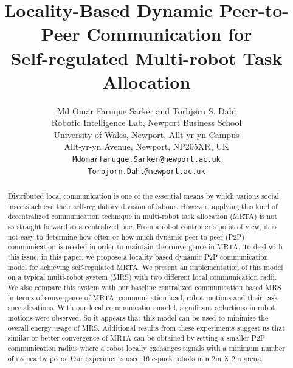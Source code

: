 \documentclass[letterpaper, 10 pt, times, conference]{ieeeconf} %
\title{\LARGE \bf
Locality-Based Dynamic Peer-to-Peer Communication for\\ Self-regulated Multi-robot Task Allocation
}
\author{ Md Omar Faruque Sarker and Torbj{\o}rn S. Dahl\\
Robotic Intelligence Lab, Newport Business School\\
University of Wales, Newport, Allt-yr-yn Campus\\ 
Allt-yr-yn Avenue, Newport, NP205XR, UK\\
{\tt\small Mdomarfaruque.Sarker@newport.ac.uk}\\ 
{\tt\small Torbjorn.Dahl@newport.ac.uk} 
}
\begin{document}
\maketitle
\thispagestyle{empty}
\pagestyle{empty}
\begin{abstract}
Distributed local communication is one of the essential means by which various social insects achieve their self-regulatory division of labour. However, applying this kind of decentralized communication technique in multi-robot task allocation (MRTA) is not as straight forward as a centralized one. From a robot controller's point of view, it is not easy to determine how often or how much dynamic peer-to-peer (P2P) communication is needed in order to maintain the convergence in MRTA. To deal with this issue, in this paper, we propose a locality based dynamic P2P communication model for achieving self-regulated MRTA. We present an implementation of this model on a typical multi-robot system (MRS) with two different local communication radii. We also compare this system with our baseline centralized communication based MRS in terms of convergence of MRTA, communication load, robot motions and their task specializations.  With our local communication model,  significant reductions in robot motions were observed. So it appears that this model can be used to minimize the overall energy usage of MRS. Additional results from these experiments suggest us that similar or better convergence of MRTA can be obtained by setting a smaller P2P communication radius where a robot locally exchanges signals with a minimum number of its nearby peers. Our experiments used 16 e-puck robots in a 2m X 2m arena.
%
\end{abstract}
%
\end{document}
